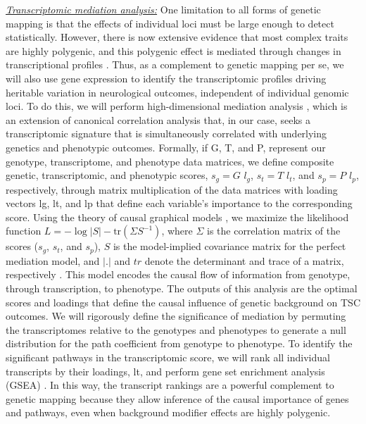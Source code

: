 \documentclass[
  12pt,
]{article}
\begin{document}
\textit{\underline{Transcriptomic mediation analysis:}} One limitation
to all forms of genetic mapping is that the effects of individual loci
must be large enough to detect statistically. However, there is now
extensive evidence that most complex traits are highly polygenic, and
this polygenic effect is mediated through changes in transcriptional
profiles \cite{28622505, 31051098}. Thus, as a complement to genetic
mapping per se, we will also use gene expression to identify the
transcriptomic profiles driving heritable variation in neurological
outcomes, independent of individual genomic loci. To do this, we will
perform high-dimensional mediation analysis \cite{28637279}, which is an
extension of canonical correlation analysis that, in our case, seeks a
transcriptomic signature that is simultaneously correlated with
underlying genetics and phenotypic outcomes. Formally, if G, T, and P,
represent our genotype, transcriptome, and phenotype data matrices, we
define composite genetic, transcriptomic, and phenotypic scores,
\(s_g = G\) \(l_g\), \(s_t = T\) \(l_t\), and \(s_p = P\) \(l_p\),
respectively, through matrix multiplication of the data matrices with
loading vectors lg, lt, and lp that define each variable's importance to
the corresponding score. Using the theory of causal graphical models
\cite{21218138, 22496633}, we maximize the likelihood function
\(L = -\log|S| - \mathrm{tr}(\Sigma S^{-1})\), where \(\Sigma\) is the
correlation matrix of the scores (\(s_g\), \(s_t\), and \(s_p\)), \(S\)
is the model-implied covariance matrix for the perfect mediation model,
and \(|.|\) and \(tr\) denote the determinant and trace of a matrix,
respectively \cite{bollen_structural_1989}. This model encodes the
causal flow of information from genotype, through transcription, to
phenotype. The outputs of this analysis are the optimal scores and
loadings that define the causal influence of genetic background on TSC
outcomes. We will rigorously define the significance of mediation by
permuting the transcriptomes relative to the genotypes and phenotypes to
generate a null distribution for the path coefficient from genotype to
phenotype. To identify the significant pathways in the transcriptomic
score, we will rank all individual transcripts by their loadings, lt,
and perform gene set enrichment analysis (GSEA) \cite{16199517}. In this
way, the transcript rankings are a powerful complement to genetic
mapping because they allow inference of the causal importance of genes
and pathways, even when background modifier effects are highly
polygenic.
\end{document}
